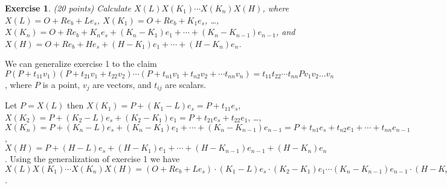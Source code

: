 \documentclass[11pt,fleqn]{amsproc}
\newtheorem{xca}{Exercise}
\begin{document}
\begin{xca}{(20 points)}
Calculate $X(L)X(K_1)\cdots X(K_n)X(H)$, where $X(L) = O + Re_b + Le_s$,
$X(K_1) = O + Re_b + K_1e_s$, \dots, $X(K_n) = O + Re_b + K_ne_s + (K_n -
K_1)e_1 + \cdots + (K_n - K_{n-1})e_{n-1}$, and $X(H) = O + Re_b + He_s +
(H - K_1)e_1 + \cdots + (H - K_n)e_n$.

\end{xca}

We can generalize exercise 1 to the claim
$P(P + t_{11}v_1)(P + t_{21}v_1 + t_{22}v_2)\cdots
(P + t_{n1}v_1 + t_{n2}v_2 + \cdots t_{nn}v_n)
= t_{11}t_{22}\cdots t_{nn} Pv_1v_2\dots v_n$, where
$P$ is a point, $v_j$ are vectors, and $t_{ij}$ are scalars.

Let $P = X(L)$ then $X(K_1) = P + (K_1 - L)e_s = P + t_{11}e_s$, $X(K_2)
= P + (K_2 - L)e_s + (K_2 - K_1)e_1 = P + t_{21}e_s + t_{22}e_1$,
\dots, $X(K_n) = P + (K_n - L)e_s + (K_n - K_1)e_1 + \cdots + (K_n -
K_{n-1})e_{n - 1} = P + t_{n1}e_s + t_{n2}e_1 + \cdots + t_{nn}e_{n-1}$,
$X(H)   = P + (H - L)e_s + (H - K_1)e_1 + \cdots + (H - K_{n-1})e_{n
- 1} + (H - K_n) e_n$.  Using the generalization of exercise 1 we have
$X(L)X(K_1)\cdots X(K_n)X(H) = (O + Re_b + Le_s)\cdot(K_1 - L)e_s \cdot
(K_2 - K_1)e_1 \cdots (K_n - K_{n-1})e_{n - 1}\cdot (H - K_n) e_n = (K_1 -
L)(K_2 - K_1)\cdots(K_n - K_{n-1})(H - K_n)(O + Re_b)e_se_1\cdots e_n$.
\end{document}
